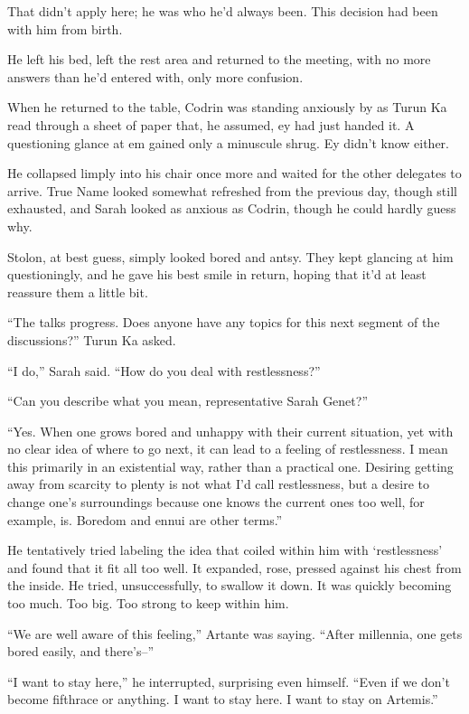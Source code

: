 That didn't apply here; he was who he'd always been. This decision had been with him from birth.

He left his bed, left the rest area and returned to the meeting, with no more answers than he'd entered with, only more confusion.

When he returned to the table, Codrin was standing anxiously by as Turun Ka read through a sheet of paper that, he assumed, ey had just handed it. A questioning glance at em gained only a minuscule shrug. Ey didn't know either.

He collapsed limply into his chair once more and waited for the other delegates to arrive. True Name looked somewhat refreshed from the previous day, though still exhausted, and Sarah looked as anxious as Codrin, though he could hardly guess why.

Stolon, at best guess, simply looked bored and antsy. They kept glancing at him questioningly, and he gave his best smile in return, hoping that it'd at least reassure them a little bit.

``The talks progress. Does anyone have any topics for this next segment of the discussions?'' Turun Ka asked.

``I do,'' Sarah said. ``How do you deal with restlessness?''

``Can you describe what you mean, representative Sarah Genet?''

``Yes. When one grows bored and unhappy with their current situation, yet with no clear idea of where to go next, it can lead to a feeling of restlessness. I mean this primarily in an existential way, rather than a practical one. Desiring getting away from scarcity to plenty is not what I'd call restlessness, but a desire to change one's surroundings because one knows the current ones too well, for example, is. Boredom and ennui are other terms.''

He tentatively tried labeling the idea that coiled within him with `restlessness' and found that it fit all too well. It expanded, rose, pressed against his chest from the inside. He tried, unsuccessfully, to swallow it down. It was quickly becoming too much. Too big. Too strong to keep within him.

``We are well aware of this feeling,'' Artante was saying. ``After millennia, one gets bored easily, and there's--''

``I want to stay here,'' he interrupted, surprising even himself. ``Even if we don't become fifthrace or anything. I want to stay here. I want to stay on Artemis.''

